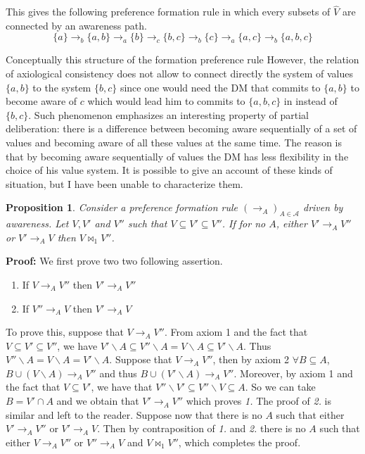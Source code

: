\documentclass[11pt]{article}
\newtheorem{proposition}{Proposition}
\begin{document}
 This gives the following preference formation rule in which every subsets of $\hat{V}$ are connected by an awareness path. 
  \[
 \{a\}\rightarrow_b\{a,b\} \rightarrow_a \{b\}\rightarrow_c \{b,c\}\rightarrow_b \{c\}\rightarrow_a \{a,c\}\rightarrow_b\{a,b,c\}
 \]
 
 
 Conceptually this structure of the formation preference rule However, the relation of axiological consistency does not allow to connect directly the system of values $\{a,b\}$ to the system $\{b,c\}$ since one would need the DM that commits to $\{a,b\}$ to become aware of $c$ which would lead him to commits to $\{a,b,c\}$ in instead of $\{b,c\}$. Such phenomenon emphasizes an interesting property of partial deliberation: there is a difference between becoming aware sequentially of a set of values and becoming aware of all these values at the same time. The reason is that by becoming aware sequentially of values the DM has less flexibility in the choice of his value system. It is possible to give an account of these kinds of situation, but I have been unable to characterize them.

\begin{proposition}
Consider a preference formation rule $(\rightarrow_A)_{A\in \mathcal{A}}$ driven by awareness. Let $V,V'$ and $V''$ such that $V\subseteq V' \subseteq V''$.  If for no $A$, either $V'\rightarrow_A V''$ or $V'\rightarrow_A V$ then $V\bowtie_1 V''$.

\end{proposition}

\noindent
\textbf{Proof:} We first prove two two following assertion. 
\begin{enumerate}
\item If $V\rightarrow_A V''$ then $V'\rightarrow_A V''$
\item If $V''\rightarrow_A V$ then $V'\rightarrow_A V$
\end{enumerate}
To prove this, suppose that  $V\rightarrow_A V''$. From axiom 1 and the fact that  $V\subseteq V' \subseteq V''$, we have  $V'\backslash A\subseteq V''\backslash A = V\backslash A \subseteq V'\backslash A$.  Thus  $V''\backslash A = V\backslash A = V'\backslash A$. Suppose that $V\rightarrow_A V''$, then by   axiom 2 $\forall B \subseteq A$, $B\cup (V\backslash A) \rightarrow_A V''$ and thus  $B\cup (V'\backslash A) \rightarrow_A V''$. Moreover, by axiom 1 and  the fact that $V\subseteq V'$, we have that $V''\backslash V' \subseteq V''\backslash V \subseteq A$. So we can take $B= V' \cap A$ and we obtain that $V' \rightarrow_A V''$ which proves \textit{1.} The proof of \textit{2.} is similar and left to the reader. Suppose now that there is no $A$ such that either $V'\rightarrow_A V''$ or $V'\rightarrow_A V$. Then by contraposition of \textit{1.} and \textit{2.}  there is no $A$ such that either $V\rightarrow_A V''$ or $V''\rightarrow_A V$ and $V\bowtie_1 V''$, which completes the proof. 
\end{document}
